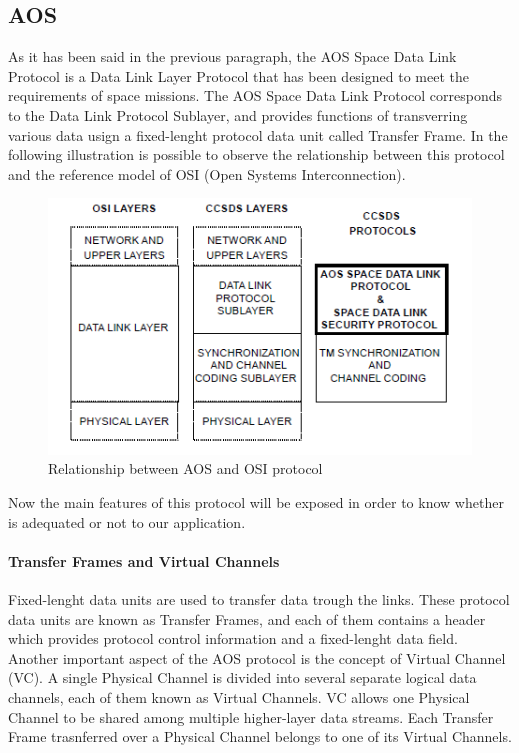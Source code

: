 \documentclass[12pt,a4paper]{report}
\begin{document}
\subsection{AOS}
As it has been said in the previous paragraph, the AOS Space Data Link Protocol is a Data Link Layer Protocol that has been designed to meet the requirements of space missions. The AOS Space Data Link Protocol corresponds to the Data Link Protocol Sublayer, and provides functions of transverring various data usign a fixed-lenght protocol data unit called Transfer Frame. In the following illustration is possible to observe the relationship between this protocol and the reference model of OSI (Open Systems Interconnection).
\begin{figure}[H]
\centering
\includegraphics[scale=1]{AOS.PNG} 
\caption{Relationship between AOS and OSI protocol}
\end{figure}
Now the main features of this protocol will be exposed in order to know whether is adequated or not to our application.
\paragraph{Transfer Frames and Virtual Channels}
Fixed-lenght data units are used to transfer data trough the links. These protocol data units are known as Transfer Frames, and each of them contains a header which provides protocol control information and a fixed-lenght data field. Another important aspect of the AOS protocol is the concept of Virtual Channel (VC). A single Physical Channel is divided into several separate logical data channels, each of them known as Virtual Channels. VC allows one Physical Channel to be shared among multiple higher-layer data streams. Each Transfer Frame trasnferred over a Physical Channel belongs to one of its Virtual Channels.
\end{document}
